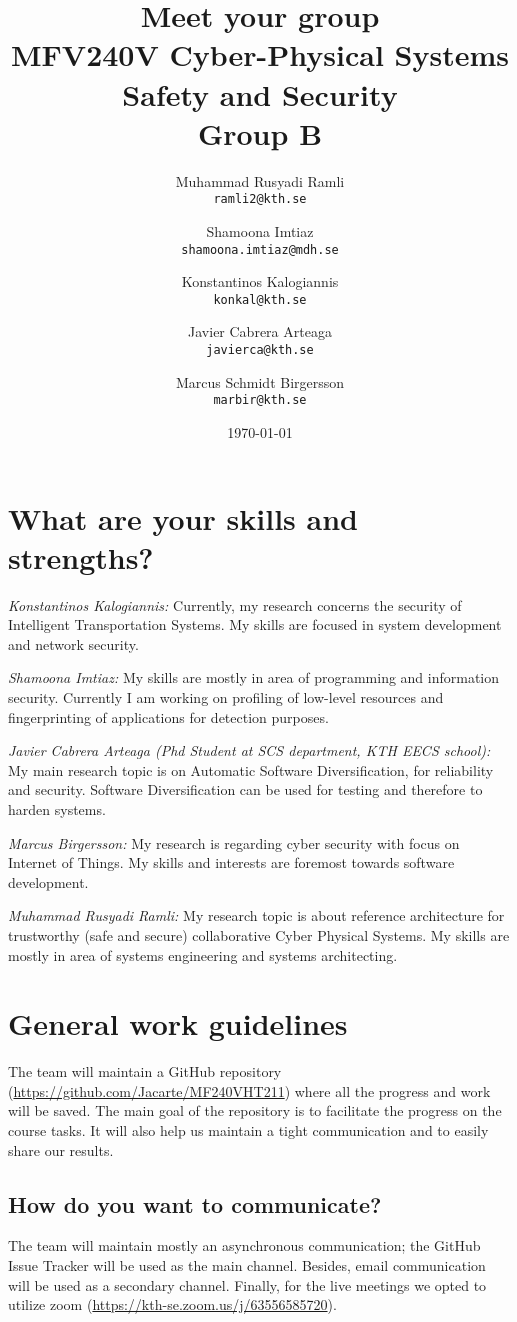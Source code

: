 \documentclass{article}
\title{Meet your group \\ \large MFV240V Cyber-Physical Systems Safety and Security \\ Group B}
\author{
  \and
  Muhammad Rusyadi Ramli\\
  \texttt{ramli2@kth.se}
  \and
  Shamoona Imtiaz\\
  \texttt{shamoona.imtiaz@mdh.se}
  \and
  Konstantinos Kalogiannis\\
  \texttt{konkal@kth.se}
  \and
  Javier Cabrera Arteaga\\
  \texttt{javierca@kth.se}
  \and
  Marcus Schmidt Birgersson\\
  \texttt{marbir@kth.se}
}
\date{\today}
\begin{document}
\maketitle


\section{What are your skills and strengths?}

\textit{Konstantinos Kalogiannis:} Currently, my research concerns the security of Intelligent Transportation Systems. My skills are focused in system development and network security.

\textit {Shamoona Imtiaz:} My skills are mostly in area of programming and information security. Currently I am working on profiling of low-level resources and fingerprinting of applications for detection purposes.

\textit{Javier Cabrera Arteaga (Phd Student at SCS department, KTH EECS school):} My main research topic is on Automatic Software Diversification, for reliability and security. Software Diversification can be used for testing and therefore to harden systems.

\textit {Marcus Birgersson:} My research is regarding cyber security with focus on Internet of Things. My skills and interests are foremost towards software development.

\textit {Muhammad Rusyadi Ramli:} My research topic is about reference architecture for trustworthy (safe and secure) collaborative Cyber Physical Systems. My skills are mostly in area of systems engineering and systems architecting.

\section{General work guidelines}

The team will maintain a GitHub repository (\url{https://github.com/Jacarte/MF240VHT211}) where all the progress and work will be saved. The main goal of the repository is to facilitate the progress on the course tasks. It will also help us maintain a tight communication and to easily share our results. 

\subsection{How do you want to communicate?}

The team will maintain mostly an asynchronous communication; the GitHub Issue Tracker will be used as the main channel. Besides, email communication will be used as a secondary channel. Finally, for the live meetings we opted to utilize zoom (\url{https://kth-se.zoom.us/j/63556585720}).
\end{document}
